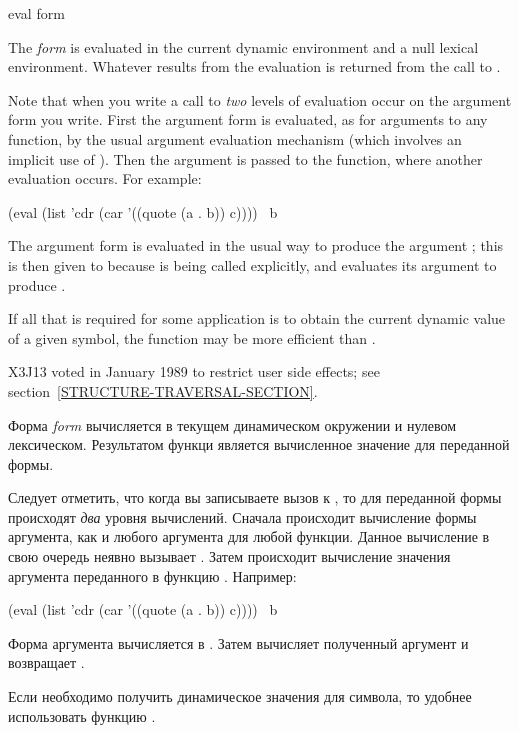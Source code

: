 \begin{defun}[Function]
eval form

The \emph{form} is evaluated in the current dynamic environment and
a null lexical environment.  Whatever results from the evaluation
is returned from the call to .

Note that when you write a call to  \emph{two} levels
of evaluation occur on the argument form you write.
First the argument form is evaluated, as for arguments to any function,
by the usual argument evaluation mechanism
(which involves an implicit use of ).  Then the argument
is passed to the  function, where another evaluation occurs.
For example:
\begin{lisp}
(eval (list 'cdr (car '((quote (a . b)) c)))) \EV\ b
\end{lisp}
The argument form  is evaluated
in the usual way to produce the argument ;
this is then given to  because  is being called explicitly,
and  evaluates its argument  to produce .

If all that is required for some application is
to obtain the current dynamic value of a given symbol, the function
 may be more efficient than .

\begin{new}
X3J13 voted in January 1989
to restrict user side effects; see section~\ref{STRUCTURE-TRAVERSAL-SECTION}.
\end{new}

Форма \emph{form} вычисляется в текущем динамическом окружении и нулевом
лексическом. Результатом функци является вычисленное значение для переданной
формы.

Следует отметить, что когда вы записываете вызов к , то для переданной
формы происходят \emph{два} уровня вычислений.
Сначала происходит вычисление формы аргумента, как и любого аргумента для любой
функции. Данное вычисление в свою очередь неявно вызывает .
Затем происходит вычисление значения аргумента переданного в функцию .
Например:
\begin{lisp}
(eval (list 'cdr (car '((quote (a . b)) c)))) \EV\ b
\end{lisp}
Форма аргумента  вычисляется в
.
Затем  вычисляет полученный аргумент и возвращает .

Если необходимо получить динамическое значения для символа, то удобнее
использовать функцию .
\end{defun}


